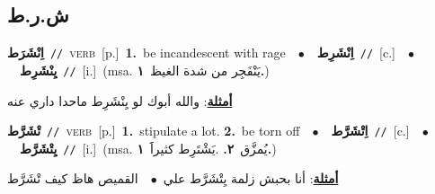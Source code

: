 \documentclass[10pt,a4paper,twoside]{article} %
\begin{document}
\begin{multicols}{2}
\vspace{-3mm}
\subsection*{\color{blue}\foreignlanguage{arabic}{ش.ر.ط}\color{blue}{}} 

{\setlength\topsep{0pt}\textbf{\foreignlanguage{arabic}{اِنْشَرَط}}\ {\color{gray}\texttt{//}\color{black}}\ \textsc{verb}\ [p.]\ \textbf{1.}~be incandescent with rage\ \ $\bullet$\ \ \setlength\topsep{0pt}\textbf{\foreignlanguage{arabic}{اِنْشَرِط}}\ {\color{gray}\texttt{//}\color{black}}\ [c.]\ \ $\bullet$\ \ \setlength\topsep{0pt}\textbf{\foreignlanguage{arabic}{يِنْشَرِط}}\ {\color{gray}\texttt{//}\color{black}}\ [i.]\ \color{gray}(msa. \foreignlanguage{arabic}{يَنْفَجِر من شدة الغيظ}~\foreignlanguage{arabic}{\textbf{١.}})\color{black}\  \begin{flushright}\color{gray}\foreignlanguage{arabic}{\textbf{\underline{\foreignlanguage{arabic}{أمثلة}}}: والله أبوك لو يِنْشَرِط ماحدا داري عنه}\end{flushright}\color{black}} \vspace{2mm}

{\setlength\topsep{0pt}\textbf{\foreignlanguage{arabic}{تْشَرَّط}}\ {\color{gray}\texttt{//}\color{black}}\ \textsc{verb}\ [p.]\ \textbf{1.}~stipulate a lot.  \textbf{2.}~be torn off\ \ $\bullet$\ \ \setlength\topsep{0pt}\textbf{\foreignlanguage{arabic}{اِتْشَرَّط}}\ {\color{gray}\texttt{//}\color{black}}\ [c.]\ \ $\bullet$\ \ \setlength\topsep{0pt}\textbf{\foreignlanguage{arabic}{يِتْشَرَّط}}\ {\color{gray}\texttt{//}\color{black}}\ [i.]\ \color{gray}(msa. \foreignlanguage{arabic}{يُمزَّق}~\foreignlanguage{arabic}{\textbf{٢.}}  .\foreignlanguage{arabic}{يَشْتَرِط كثيراََ}~\foreignlanguage{arabic}{\textbf{١.}})\color{black}\  \begin{flushright}\color{gray}\foreignlanguage{arabic}{\textbf{\underline{\foreignlanguage{arabic}{أمثلة}}}: أنا بحبش زلمة يِتْشَرَّط علي\ $\bullet$\ \  القميص هاظ كيف تْشَرَّط}\end{flushright}\color{black}} \vspace{2mm}


\end{multicols}
\end{document}
